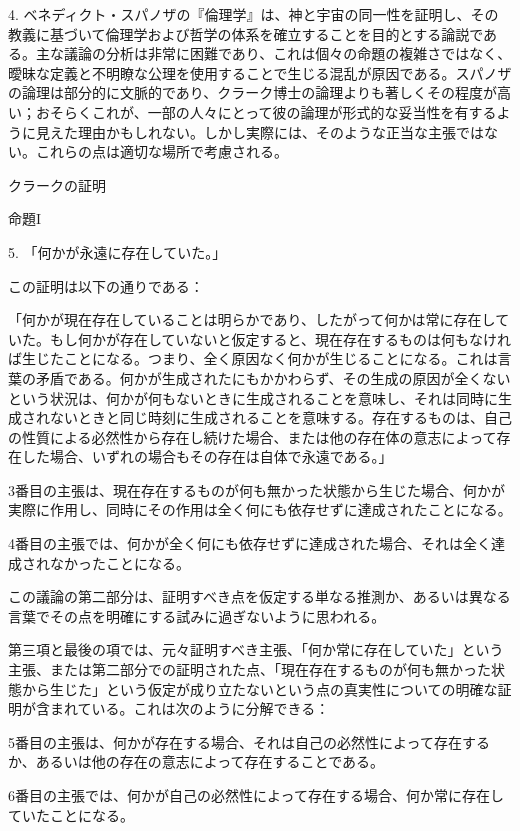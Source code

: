\documentclass[a4paper,11pt,openany]{ltjsbook}
\begin{document}
4. ベネディクト・スパノザの『倫理学』は、神と宇宙の同一性を証明し、その教義に基づいて倫理学および哲学の体系を確立することを目的とする論説である。主な議論の分析は非常に困難であり、これは個々の命題の複雑さではなく、曖昧な定義と不明瞭な公理を使用することで生じる混乱が原因である。スパノザの論理は部分的に文脈的であり、クラーク博士の論理よりも著しくその程度が高い；おそらくこれが、一部の人々にとって彼の論理が形式的な妥当性を有するように見えた理由かもしれない。しかし実際には、そのような正当な主張ではない。これらの点は適切な場所で考慮される。

\begin{center}
\textsc{クラークの証明}

\textsc{命題I}
\end{center}

5. 「何かが永遠に存在していた。」

この証明は以下の通りである：

「何かが現在存在していることは明らかであり、したがって何かは常に存在していた。もし何かが存在していないと仮定すると、現在存在するものは何もなければ生じたことになる。つまり、全く原因なく何かが生じることになる。これは言葉の矛盾である。何かが生成されたにもかかわらず、その生成の原因が全くないという状況は、何かが何もないときに生成されることを意味し、それは同時に生成されないときと同じ時刻に生成されることを意味する。存在するものは、自己の性質による必然性から存在し続けた場合、または他の存在体の意志によって存在した場合、いずれの場合もその存在は自体で永遠である。」

3番目の主張は、現在存在するものが何も無かった状態から生じた場合、何かが実際に作用し、同時にその作用は全く何にも依存せずに達成されたことになる。

4番目の主張では、何かが全く何にも依存せずに達成された場合、それは全く達成されなかったことになる。

この議論の第二部分は、証明すべき点を仮定する単なる推測か、あるいは異なる言葉でその点を明確にする試みに過ぎないように思われる。

第三項と最後の項では、元々証明すべき主張、「何か常に存在していた」という主張、または第二部分での証明された点、「現在存在するものが何も無かった状態から生じた」という仮定が成り立たないという点の真実性についての明確な証明が含まれている。これは次のように分解できる：

5番目の主張は、何かが存在する場合、それは自己の必然性によって存在するか、あるいは他の存在の意志によって存在することである。

6番目の主張では、何かが自己の必然性によって存在する場合、何か常に存在していたことになる。
\end{document}
